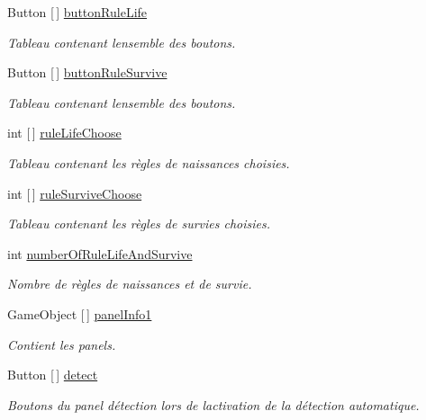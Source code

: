 \begin{DoxyCompactItemize}
Button \mbox{[}$\,$\mbox{]} \mbox{\hyperlink{class_parameters_a8f92648a7ee23e4e0b57a1a03c70615d}{button\+Rule\+Life}}
\begin{DoxyCompactList}\small\item\em Tableau contenant l\textquotesingle{}ensemble des boutons. \end{DoxyCompactList}\item 
Button \mbox{[}$\,$\mbox{]} \mbox{\hyperlink{class_parameters_a2649c58bc9e1fea496719ad146d272fe}{button\+Rule\+Survive}}
\begin{DoxyCompactList}\small\item\em Tableau contenant l\textquotesingle{}ensemble des boutons. \end{DoxyCompactList}\item 
int \mbox{[}$\,$\mbox{]} \mbox{\hyperlink{class_parameters_a69cb36fa8095b0a0b37a035e2dc21d2f}{rule\+Life\+Choose}}
\begin{DoxyCompactList}\small\item\em Tableau contenant les règles de naissances choisies. \end{DoxyCompactList}\item 
int \mbox{[}$\,$\mbox{]} \mbox{\hyperlink{class_parameters_abd8a872a3447aa8cf784a98cf211a7c3}{rule\+Survive\+Choose}}
\begin{DoxyCompactList}\small\item\em Tableau contenant les règles de survies choisies. \end{DoxyCompactList}\item 
int \mbox{\hyperlink{class_parameters_a9f5c0caa798160b623118c5c81932daa}{number\+Of\+Rule\+Life\+And\+Survive}}
\begin{DoxyCompactList}\small\item\em Nombre de règles de naissances et de survie. \end{DoxyCompactList}\item 
Game\+Object \mbox{[}$\,$\mbox{]} \mbox{\hyperlink{class_parameters_a21e4cca4e061b650741354680361136c}{panel\+Info1}}
\begin{DoxyCompactList}\small\item\em Contient les panels. \end{DoxyCompactList}\item 
Button \mbox{[}$\,$\mbox{]} \mbox{\hyperlink{class_parameters_a0976e55ec506eb31b8be9d56d66a98c7}{detect}}
\begin{DoxyCompactList}\small\item\em Boutons du panel détection lors de l\textquotesingle{}activation de la détection automatique. \end{DoxyCompactList}\item 

\end{DoxyCompactItemize}
